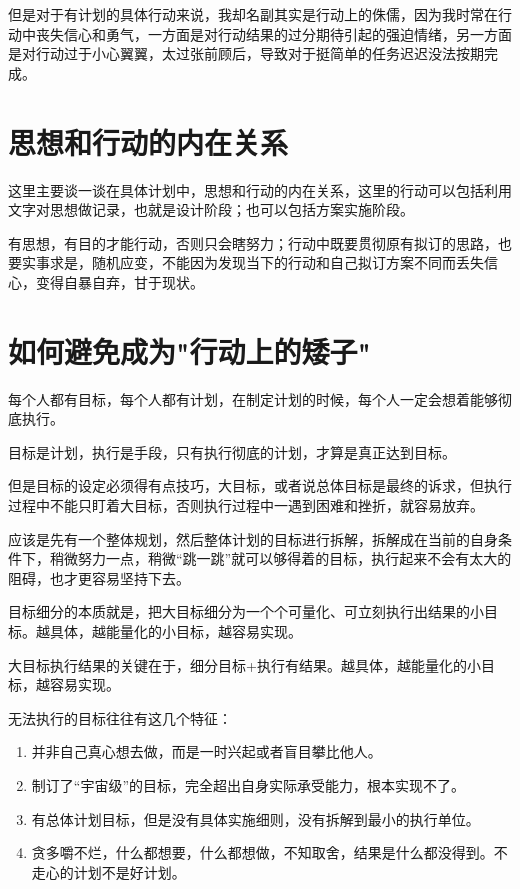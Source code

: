 但是对于有计划的具体行动来说，我却名副其实是行动上的侏儒，因为我时常在行动中丧失信心和勇气，一方面是对行动结果的过分期待引起的强迫情绪，另一方面是对行动过于小心翼翼，太过张前顾后，导致对于挺简单的任务迟迟没法按期完成。

\section{思想和行动的内在关系}

这里主要谈一谈在具体计划中，思想和行动的内在关系，这里的行动可以包括利用文字对思想做记录，也就是设计阶段；也可以包括方案实施阶段。

有思想，有目的才能行动，否则只会瞎努力；行动中既要贯彻原有拟订的思路，也要实事求是，随机应变，不能因为发现当下的行动和自己拟订方案不同而丢失信心，变得自暴自弃，甘于现状。

\section{如何避免成为"行动上的矮子"}

每个人都有目标，每个人都有计划，在制定计划的时候，每个人一定会想着能够彻底执行。

目标是计划，执行是手段，只有执行彻底的计划，才算是真正达到目标。

但是目标的设定必须得有点技巧，大目标，或者说总体目标是最终的诉求，但执行过程中不能只盯着大目标，否则执行过程中一遇到困难和挫折，就容易放弃。

应该是先有一个整体规划，然后整体计划的目标进行拆解，拆解成在当前的自身条件下，稍微努力一点，稍微“跳一跳”就可以够得着的目标，执行起来不会有太大的阻碍，也才更容易坚持下去。

目标细分的本质就是，把大目标细分为一个个可量化、可立刻执行出结果的小目标。越具体，越能量化的小目标，越容易实现。

大目标执行结果的关键在于，细分目标+执行有结果。越具体，越能量化的小目标，越容易实现。

无法执行的目标往往有这几个特征：
\begin{enumerate}
    \item 并非自己真心想去做，而是一时兴起或者盲目攀比他人。
    \item 制订了“宇宙级”的目标，完全超出自身实际承受能力，根本实现不了。
    \item 有总体计划目标，但是没有具体实施细则，没有拆解到最小的执行单位。
    \item 贪多嚼不烂，什么都想要，什么都想做，不知取舍，结果是什么都没得到。不走心的计划不是好计划。
\end{enumerate}

